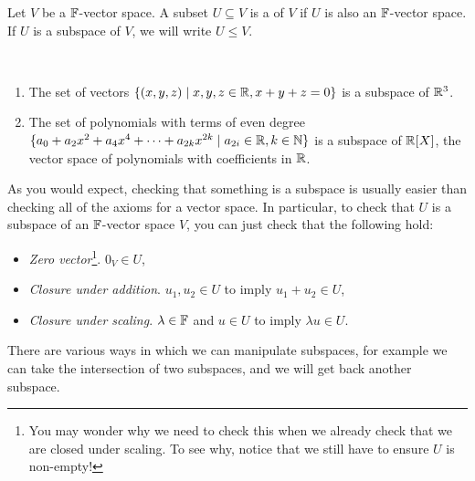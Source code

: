 \documentclass[a4paper]{scrartcl}
\begin{document}
\begin{definition}[Subspace]
    Let $V$ be a $\mathbb{F}$-vector space.
    A subset $U \subseteq V$ is a  of $V$ if $U$ is also an $\mathbb{F}$-vector space. If $U$ is a subspace of $V$, we will write $U \leq V$.
    
\end{definition}

\begin{example}~
    \vspace{-1.5\baselineskip}
    \begin{enumerate}[label=(\roman*)]
        \item The set of vectors $\{(x, y, z) \mid x, y, z \in \mathbb{R}, x + y + z = 0\}$ is a subspace of $\mathbb{R}^3$.
        \item The set of polynomials with terms of even degree $\{ a_0 + a_2 x^2 + a_4 x^4 + \cdots + a_{2k} x^{2k} \mid a_{2i} \in \mathbb{R}, k \in \mathbb{N}\}$ is a subspace of $\mathbb{R}[X]$, the vector space of polynomials with coefficients in $\mathbb{R}$.
    \end{enumerate}
\end{example}

As you would expect, checking that something is a subspace is usually easier than checking all of the axioms for a vector space. In particular, to check that $U$ is a subspace of an $\mathbb{F}$-vector space $V$, you can just check that the following hold:
\begin{itemize}
    \item \emph{Zero vector}\footnote{You may wonder why we need to check this when we already check that we are closed under scaling. To see why, notice that we still have to ensure $U$ is non-empty!}. $0_V \in U$,
    \item \emph{Closure under addition}. $u_1, u_2 \in U$ to imply $u_1 + u_2 \in U$,
    \item \emph{Closure under scaling}. $\lambda \in \mathbb{F}$ and $u \in U$ to imply $\lambda u \in U$.
\end{itemize}


There are various ways in which we can manipulate subspaces, for example we can take the intersection of two subspaces, and we will get back another subspace. 
\end{document}

